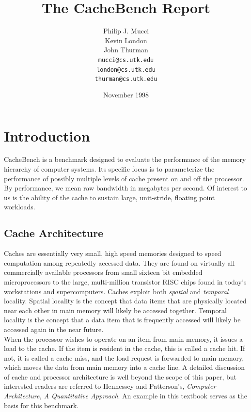 \documentclass [12pt]{article}
\begin{document}
\title{The CacheBench Report}
\author {Philip J. Mucci \\
	Kevin London \\
	John Thurman \\
        {\tt mucci@cs.utk.edu} \\
	{\tt london@cs.utk.edu} \\
	{\tt thurman@cs.utk.edu}}
\date{November 1998}

\maketitle

\section{Introduction}

CacheBench is a benchmark designed to evaluate the performance of the
memory hierarchy of computer systems. Its specific focus is to
parameterize the performance of possibly multiple levels of cache
present on and off the processor. By performance, we mean raw bandwidth
in megabytes per second. Of interest to us is the ability of the cache to 
sustain large, unit-stride, floating point workloads.

\subsection{Cache Architecture}

Caches are essentially very small, high speed memories designed to
speed computation among repeatedly accessed data. They are found on
virtually all commercially available processors from small sixteen bit
embedded microprocessors to the large, multi-million transistor RISC
chips found in today's workstations and supercomputers. Caches exploit
both {\em spatial} and {\em temporal} locality. Spatial locality is 
the concept that
data items that are physically located near each other in main memory
will likely be accessed together. Temporal locality is the concept
that a data item that is frequently accessed will likely be accessed
again in the near future. \\

 When the processor wishes to operate on an item from main memory, it
 issues a load to the cache. If the item is resident in the cache,
 this is called a cache hit. If not, it is called a cache miss, and
 the load request is forwarded to main memory, which moves the data
 from main memory into a cache line. A detailed discussion of cache and processor
 architecture is well beyond the scope of this paper, but interested
 readers are referred to Hennessey and Patterson's, {\em Computer
 Architecture, A Quantitative Approach}. An example in this textbook 
 serves as the basis for this benchmark.
\end{document}
